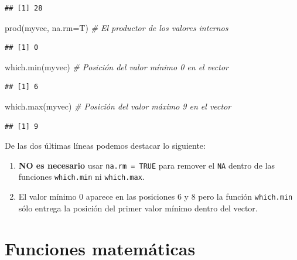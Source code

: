 \documentclass[
]{book}
\makeatletter
\newenvironment{Shaded}{\begin{snugshade}}{\end{snugshade}}
\newcommand{\AttributeTok}[1]{\textcolor[rgb]{0.77,0.63,0.00}{#1}}
\newcommand{\CommentTok}[1]{\textcolor[rgb]{0.56,0.35,0.01}{\textit{#1}}}
\newcommand{\FunctionTok}[1]{\textcolor[rgb]{0.00,0.00,0.00}{#1}}
\newcommand{\NormalTok}[1]{#1}
\providecommand{\tightlist}{%
  \setlength{\itemsep}{0pt}\setlength{\parskip}{0pt}}
\newenvironment{kframe}{%
\medskip{}
\setlength{\fboxsep}{.8em}
 \def\at@end@of@kframe{}%
 \ifinner\ifhmode%
  \def\at@end@of@kframe{\end{minipage}}%
  \begin{minipage}{\columnwidth}%
 \fi\fi%
 \def\FrameCommand##1{\hskip\@totalleftmargin \hskip-\fboxsep
 \colorbox{shadecolor}{##1}\hskip-\fboxsep
     \hskip-\linewidth \hskip-\@totalleftmargin \hskip\columnwidth}%
 \MakeFramed {\advance\hsize-\width
   \@totalleftmargin\z@ \linewidth\hsize
   \@setminipage}}%
 {\par\unskip\endMakeFramed%
 \at@end@of@kframe}
\renewenvironment{Shaded}{\begin{kframe}}{\end{kframe}}
\makeatother
\begin{document}
\begin{verbatim}
## [1] 28
\end{verbatim}

\begin{Shaded}
\begin{Highlighting}[]
\FunctionTok{prod}\NormalTok{(myvec, }\AttributeTok{na.rm=}\NormalTok{T)  }\CommentTok{\# El productor de los valores internos}
\end{Highlighting}
\end{Shaded}

\begin{verbatim}
## [1] 0
\end{verbatim}

\begin{Shaded}
\begin{Highlighting}[]
\FunctionTok{which.min}\NormalTok{(myvec)  }\CommentTok{\# Posición del valor mínimo 0 en el vector}
\end{Highlighting}
\end{Shaded}

\begin{verbatim}
## [1] 6
\end{verbatim}

\begin{Shaded}
\begin{Highlighting}[]
\FunctionTok{which.max}\NormalTok{(myvec)  }\CommentTok{\# Posición del valor máximo 9 en el vector}
\end{Highlighting}
\end{Shaded}

\begin{verbatim}
## [1] 9
\end{verbatim}

De las dos últimas líneas podemos destacar lo siguiente:

\begin{enumerate}
\def\labelenumi{\arabic{enumi}.}
\tightlist
\item
  \textbf{NO es necesario} usar \texttt{na.rm\ =\ TRUE} para remover el \texttt{NA} dentro de las funciones \texttt{which.min} ni \texttt{which.max}.
\item
  El valor mínimo 0 aparece en las posiciones 6 y 8 pero la función \texttt{which.min} sólo entrega la posición del primer valor mínimo dentro del vector.
\end{enumerate}

\hypertarget{funciones-matemuxe1ticas}{%
\section{Funciones matemáticas}\label{funciones-matemuxe1ticas}}
\end{document}
